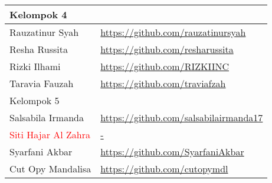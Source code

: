 \documentclass[a4paper]{tufte-handout}
\begin{document}
\begin{projects}
\begin{description}
\begin{table}[!ht]
\begin{tabular}{ll}
\midrule
Kelompok 4\\
\midrule
Rauzatinur Syah			& \url{https://github.com/rauzatinursyah} \\
Resha Russita			& \url{https://github.com/resharussita} \\
Rizki Ilhami			& \url{https://github.com/RIZKIINC} \\
Taravia Fauzah			& \url{https://github.com/traviafzah} \\
\midrule
Kelompok 5\\
\midrule
Salsabila Irmanda		& \url{https://github.com/salsabilairmanda17} \\
\textcolor{red}{Siti Hajar Al Zahra	}	& \url{-} \\
Syarfani Akbar			& \url{https://github.com/SyarfaniAkbar} \\
Cut Opy Mandalisa		& \url{https://github.com/cutopymdl} \\
\midrule
\end{tabular}
\end{table}
\end{description}
\end{projects}

\end{document}
